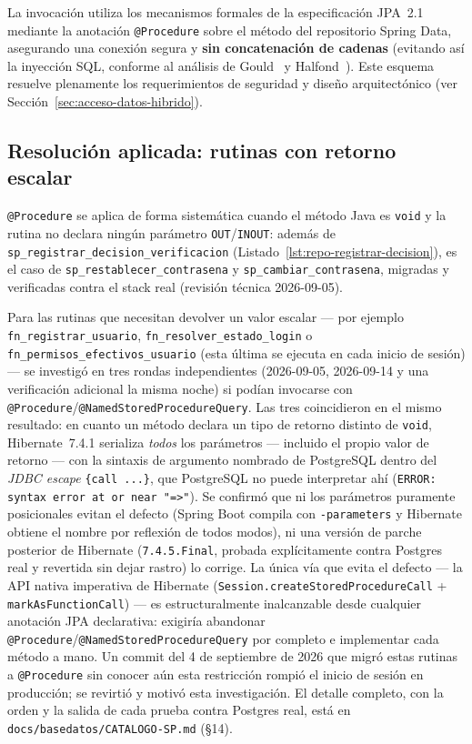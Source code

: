La invocación utiliza los mecanismos formales de la
especificación JPA~2.1 mediante la anotación \texttt{@Procedure} sobre el método del
repositorio Spring Data, asegurando una conexión segura y \textbf{sin
concatenación de cadenas} (evitando así la inyección SQL, conforme al
análisis de Gould~\cite{GOULD2004} y Halfond~\cite{HALFOND2005}). Este
esquema resuelve plenamente los requerimientos de seguridad y diseño arquitectónico (ver Sección~\ref{sec:acceso-datos-hibrido}).

\subsection{Resolución aplicada: rutinas con retorno escalar}

\texttt{@Procedure} se aplica de forma sistemática cuando el método Java es
\texttt{void} y la rutina no declara ningún parámetro \texttt{OUT}/\texttt{INOUT}: además de
\texttt{sp\_registrar\_decision\_verificacion} (Listado~\ref{lst:repo-registrar-decision}), es el
caso de \texttt{sp\_restablecer\_contrasena} y \texttt{sp\_cambiar\_contrasena}, migradas y
verificadas contra el stack real (revisión técnica 2026-09-05).

Para las rutinas que necesitan devolver un valor escalar --- por ejemplo
\texttt{fn\_registrar\_usuario}, \texttt{fn\_resolver\_estado\_login} o
\texttt{fn\_permisos\_efectivos\_usuario} (esta última se ejecuta en cada inicio de sesión) --- se
investigó en tres rondas independientes (2026-09-05, 2026-09-14 y una verificación adicional la
misma noche) si podían invocarse con \texttt{@Procedure}/\texttt{@NamedStoredProcedureQuery}. Las
tres coincidieron en el mismo resultado: en cuanto un método declara un tipo de retorno distinto de
\texttt{void}, Hibernate~7.4.1 serializa \emph{todos} los parámetros --- incluido el propio valor de
retorno --- con la sintaxis de argumento nombrado de PostgreSQL dentro del \emph{JDBC escape}
\texttt{\{call ...\}}, que PostgreSQL no puede interpretar ahí
(\texttt{ERROR: syntax error at or near "=>"}). Se confirmó que ni los parámetros puramente
posicionales evitan el defecto (Spring Boot compila con \texttt{-parameters} y Hibernate obtiene el
nombre por reflexión de todos modos), ni una versión de parche posterior de Hibernate
(\texttt{7.4.5.Final}, probada explícitamente contra Postgres real y revertida sin dejar rastro) lo
corrige. La única vía que evita el defecto --- la API nativa imperativa de Hibernate
(\texttt{Session.createStoredProcedureCall} + \texttt{markAsFunctionCall}) --- es estructuralmente
inalcanzable desde cualquier anotación JPA declarativa: exigiría abandonar
\texttt{@Procedure}/\texttt{@NamedStoredProcedureQuery} por completo e implementar cada método a
mano. Un commit del 4 de septiembre de 2026 que migró estas rutinas a \texttt{@Procedure} sin
conocer aún esta restricción rompió el inicio de sesión en producción; se revirtió y motivó esta
investigación. El detalle completo, con la orden y la salida de cada prueba contra Postgres real,
está en \texttt{docs/basedatos/CATALOGO-SP.md} (\S14).

